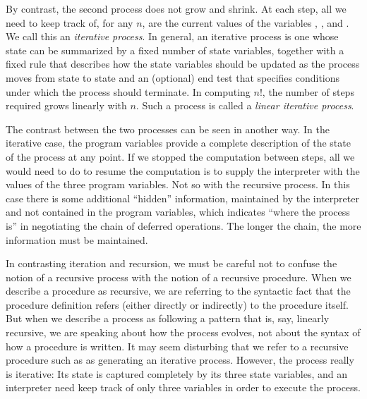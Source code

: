 By contrast, the second process does not grow and shrink. At each step, all we need to keep track of, for any $n$, are the current values of the variables , , and . We call this an \textit{iterative process}. In general, an iterative process is one whose state can be summarized by a fixed number of state variables, together with a fixed rule that describes how the state variables should be updated as the process moves from state to state and an (optional) end test that specifies conditions under which the process should terminate. In computing $n!$, the number of steps required grows linearly with $n$. Such a process is called a \textit{linear iterative process}.

The contrast between the two processes can be seen in another way. In the iterative case, the program variables provide a complete description of the state of the process at any point. If we stopped the computation between steps, all we would need to do to resume the computation is to supply the interpreter with the values of the three program variables. Not so with the recursive process. In this case there is some additional ``hidden'' information, maintained by the interpreter and not contained in the program variables, which indicates ``where the process is'' in negotiating the chain of deferred operations. The longer the chain, the more information must be maintained.

In contrasting iteration and recursion, we must be careful not to confuse the notion of a recursive process with the notion of a recursive procedure. When we describe a procedure as recursive, we are referring to the syntactic fact that the procedure definition refers (either directly or indirectly) to the procedure itself. But when we describe a process as following a pattern that is, say, linearly recursive, we are speaking about how the process evolves, not about the syntax of how a procedure is written. It may seem disturbing that we refer to a recursive procedure such as  as generating an iterative process. However, the process really is iterative: Its state is captured completely by its three state variables, and an interpreter need keep track of only three variables in order to execute the process.

